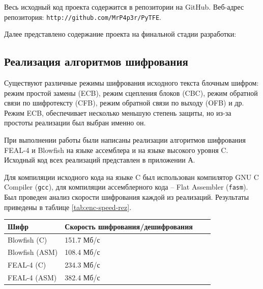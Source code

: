 
Весь исходный код проекта содержится в репозитории на GitHub.
Веб-адрес репозитория: \verb'http://github.com/MrP4p3r/PyTFE'.

\newpage
Далее представлено содержание проекта на финальной стадии разработки:



\newpage
\subsection{Реализация алгоритмов шифрования} %

Существуют различные режимы шифрования исходного текста блочным
шифром: режим простой замены (ECB), режим сцепления блоков (CBC),
режим обратной связи по шифротексту (CFB), режим обратной связи по
выходу (OFB) и др. Режим ECB, обеспечивает несколько меньшую степень защиты, но
из-за простоты реализации был выбран именно он.

При выполнении работы были написаны реализации алгоритмов шифрования
FEAL-4 и Blowfish на языке ассемблера и на языке высокого уровня C.
Исходный код всех реализаций представлен в приложении А.

Для компиляции исходного кода на языке C был использован компилятор
GNU C Compiler (\texttt{gcc}),
для компиляции ассемблерного кода -- Flat Assembler (\texttt{fasm}).
Был проведен анализ скорости шифрования каждой из реализаций. Результаты
приведены в таблице \ref{tab:enc-speed-rez}.

\noindent
\begin{minipage}{\linewidth}
  \vspace{2.5mm}
  \label{tab:enc-speed-rez}
  \vspace{-2.5mm}
  \begin{tabular}{|l|l|l|l|}
    \hline
    Шифр            & Скорость шифрования/дешифрования \\\hline
    Blowfish (C)    & 151.7 Мб/с  \\\hline
    Blowfish (ASM)  & 108.4 Мб/с  \\\hline
    FEAL-4 (C)      & 234.3 Мб/с  \\\hline
    FEAL-4 (ASM)    & 382.4 Мб/с  \\\hline
  \end{tabular}
  \vspace{2.5mm}
\end{minipage}\\

